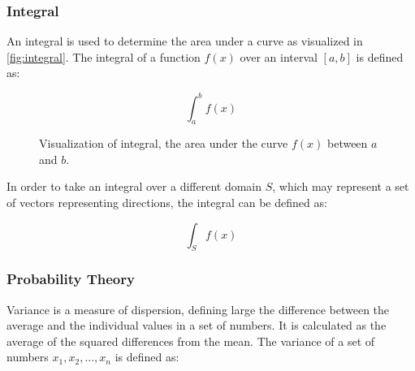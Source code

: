 \subsubsection{Integral}

An integral is used to determine the area under a curve as visualized in \autoref{fig:integral}. The integral of a function $f(x)$ over an interval $[a, b]$ is defined as:

\begin{equation}
  \label{eqn:integral}
  \int_{a}^{b} f(x)
\end{equation}

\begin{figure}[H]
  \centering
  \caption{Visualization of integral, the area under the curve $f(x)$ between $a$ and $b$.}
  \label{fig:integral}
\end{figure}

In order to take an integral over a different domain $S$, which may represent a set of vectors representing directions, the integral can be defined as:

\begin{equation}
  \label{eqn:integral-domain}
  \int_{S} f(x)
\end{equation}

\subsubsection{Probability Theory}
\label{sec:probabilityTheory}

Variance is a measure of dispersion, defining large the difference between the average and the individual values in a set of numbers. It is calculated as the average of the squared differences from the mean. The variance of a set of numbers $x_1, x_2, ..., x_n$ is defined as:

